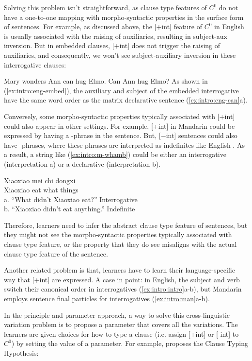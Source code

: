 Solving this problem isn't straightforward, as clause type features of $C^{0}$ do not have a one-to-one mapping with morpho-syntactic properties in the surface form of sentences. For example, as discussed above, the [+int] feature of $C^{0}$ in English is usually associated with the raising of auxiliaries, resulting in subject-aux inversion. But in embedded clauses, [+int] does not trigger the raising of auxiliaries, and consequently, we won't see subject-auxiliary inversion in these interrogative clauses: 

Mary wonders 
\eex
{}
\bxl
Ann can hug Elmo.
\ex Can Ann hug Elmo?
\exl
\eex
As shown in (\ref{ex:intro:eng-embed}), the auxiliary  and subject  of the embedded interrogative have the same word order as the matrix declarative sentence (\ref{ex:intro:eng-can}a).


Conversely, some morpho-syntactic properties typically associated with [+int] could also appear in other settings. For example, [+int] in Mandarin could be expressed by having a \twh-phrase in the sentence. But, [$-$int] sentences could also have \twh-phrases, where these phrases are interpreted as indefinites like English . As a result, a string like (\ref{ex:intro:m-whamb}) could be either an interrogative (interpretation a) or a declarative (interpretation b). 


\gll Xiaoxiao mei 	chi 	 dongxi\\ 
Xiaoxiao \Neg{} 	eat	what	things\\
a.	``What didn’t Xiaoxiao eat?''	\hfill Interrogative \twh\\
b.	``Xiaoxiao didn’t eat anything.''		\hfill Indefinite \twh
\eex

Therefore, learners need to infer the abstract clause type feature of sentences, but they might not see the morpho-syntactic properties typically associated with clause type feature, or the property that they do see misaligns with the actual clause type feature of the sentence.

Another related problem is that, learners have to learn their language-specific way that [+int] are expressed. A case in point: in English, the subject and verb switch their canonical order in interrogatives (\ref{ex:intro:intro}a-b), but Mandarin employs sentence final particles for interrogatives (\ref{ex:intro:man}a-b).  

In the principle and parameter approach, a way to solve this cross-linguistic variation problem is to propose a parameter that covers all the variations. The learners are given choices for how to type a clause (i.e. assign [+int] or [-int] to $C^{0}$) by setting the value of a parameter. For example, \textcite{cheng1991} proposes the Clause Typing Hypothesis:

